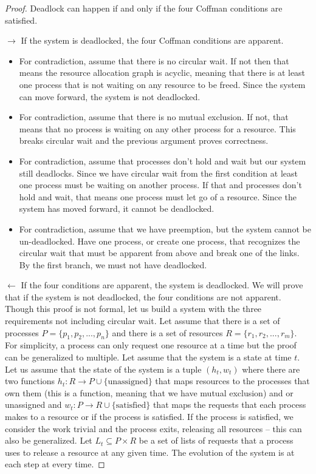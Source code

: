 \begin{proof} Deadlock can happen if and only if the four Coffman conditions are satisfied.

$\rightarrow$ If the system is deadlocked, the four Coffman conditions are apparent.

\begin{itemize}
\item For contradiction, assume that there is no circular wait. If not then that means the resource allocation graph is acyclic, meaning that there is at least one process that is not waiting on any resource to be freed. Since the system can move forward, the system is not deadlocked.
\item For contradiction, assume that there is no mutual exclusion. If not, that means that no process is waiting on any other process for a resource. This breaks circular wait and the previous argument proves correctness.
\item For contradiction, assume that processes don't hold and wait but our system still deadlocks. Since we have circular wait from the first condition at least one process must be waiting on another process. If that and processes don't hold and wait, that means one process must let go of a resource. Since the system has moved forward, it cannot be deadlocked.
\item For contradiction, assume that we have preemption, but the system cannot be un-deadlocked. Have one process, or create one process, that recognizes the circular wait that must be apparent from above and break one of the links. By the first branch, we must not have deadlocked.
\end{itemize}

$\leftarrow$ If the four conditions are apparent, the system is deadlocked.
We will prove that if the system is not deadlocked, the four conditions are not apparent.
Though this proof is not formal, let us build a system with the three requirements not including circular wait.
Let assume that there is a set of processes $P = \{p_1, p_2, ..., p_n\}$ and there is a set of resources $R = \{r_1, r_2, ..., r_m\}$.
For simplicity, a process can only request one resource at a time but the proof can be generalized to multiple.
Let assume that the system is a state at time $t$.
Let us assume that the state of the system is a tuple $(h_t, w_t)$ where there are two functions $h_t: R \rightarrow P \cup \{\text{unassigned}\}$ that maps resources to the processes that own them (this is a function, meaning that we have mutual exclusion) and or unassigned and $w_t: P \rightarrow R \cup \{\text{satisfied}\}$ that maps the requests that each process makes to a resource or if the process is satisfied.
If the process is satisfied, we consider the work trivial and the process exits, releasing all resources -- this can also be generalized.
Let $L_t \subseteq P \times R$ be a set of lists of requests that a process uses to release a resource at any given time.
The evolution of the system is at each step at every time.


\end{proof}
